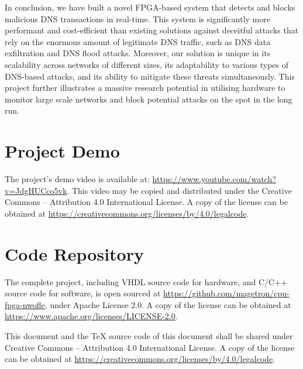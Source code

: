 \documentclass[a4paper]{report}
\newcommand{\proglang}{\textsf}
\begin{document}
In conclusion, we have built a novel FPGA-based system that detects and blocks malicious DNS transactions in real-time. This system is significantly more performant and cost-efficient than existing solutions against deceitful attacks that rely on the enormous amount of legitimate DNS traffic, such as DNS data exfiltration and DNS flood attacks. Moreover, our solution is unique in its scalability across networks of different sizes, its adaptability to various types of DNS-based attacks, and its ability to mitigate these threats simultaneously. This project further illustrates a massive research potential in utilising hardware to monitor large scale networks and block potential attacks on the spot in the long run.

\printbibliography[title=References]

\appendix

\chapter{Project Demo}

The project's demo video is available at: \url{https://www.youtube.com/watch?v=JdgHUCco5vk}. This video may be copied and distributed under the Creative Commons – Attribution 4.0 International License. A copy of the license can be obtained at \url{https://creativecommons.org/licenses/by/4.0/legalcode}.

\chapter{Code Repository}

The complete project, including \proglang{VHDL} source code for hardware, and \proglang{C/C++} source code for software, is open sourced at  \url{https://github.com/magetron/cpu-fpga-nwofle}, under Apache License 2.0. A copy of the license can be obtained at \url{https://www.apache.org/licenses/LICENSE-2.0}.

This document and the \TeX {} source code of this document shall be shared under Creative Commons – Attribution 4.0 International License. A copy of the license can be obtained at \url{https://creativecommons.org/licenses/by/4.0/legalcode}.



\end{document}
